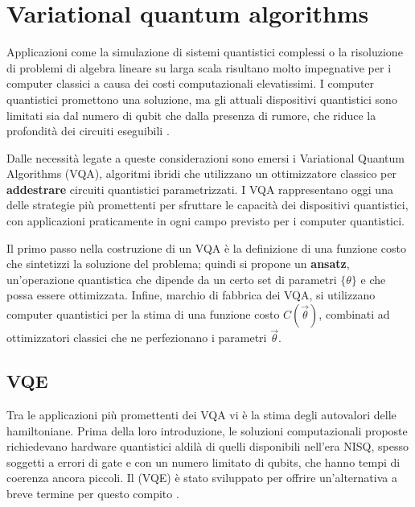 \section{Variational quantum algorithms}\label{sez:VQA}

Applicazioni come la simulazione di sistemi quantistici complessi o la risoluzione di problemi di algebra lineare su larga scala risultano molto impegnative per i computer classici a causa dei costi computazionali elevatissimi. I computer quantistici promettono una soluzione, ma gli attuali dispositivi quantistici sono limitati sia dal numero di qubit che dalla presenza di rumore, che riduce la profondità dei circuiti eseguibili \cite{Cerezo_2021}.

Dalle necessità legate a queste considerazioni sono emersi i Variational Quantum Algorithms (VQA), algoritmi ibridi che utilizzano un ottimizzatore classico per \textbf{addestrare} circuiti quantistici parametrizzati. I VQA rappresentano oggi una delle strategie più promettenti per sfruttare le capacità dei dispositivi quantistici, con applicazioni praticamente in ogni campo previsto per i computer quantistici.

Il primo passo nella costruzione di un VQA è la definizione di una funzione costo che sintetizzi la soluzione del problema; quindi si propone un \textbf{ansatz}, un'operazione quantistica che dipende da un certo set di parametri $\{\theta\}$ e che possa essere ottimizzata. Infine, marchio di fabbrica dei VQA, si utilizzano computer quantistici per la stima di una funzione costo $C(\vec{\theta})$, combinati ad ottimizzatori classici che ne perfezionano i parametri $\vec{\theta}$.

\subsection{VQE}\label{subsec:VQE}

Tra le applicazioni più promettenti dei VQA vi è la stima degli autovalori delle hamiltoniane.
Prima della loro introduzione, le soluzioni computazionali proposte richiedevano hardware quantistici aldilà di quelli disponibili nell'era NISQ, spesso soggetti a errori di gate e con un numero limitato di qubits, che hanno tempi di coerenza ancora piccoli. Il  (VQE) è stato sviluppato per offrire un'alternativa a breve termine per questo compito \cite{Peruzzo_2014}.


